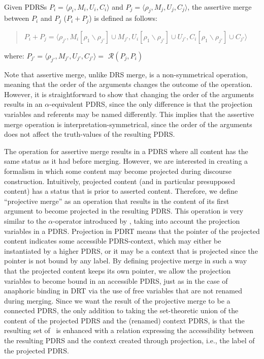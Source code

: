 \begin{definition}\label{def:amerge}~\\
Given PDRSs $P_i=\langle \rho_i,M_i,U_i,C_i \rangle$ and
$P_j=\langle \rho_j,M_j,U_j,C_j \rangle$, the assertive merge between $P_i$
and $P_j$ ($P_i + P_j$) is defined as follows:
  \begin{quote}
    $P_i + P_j = 
      \langle \rho_{j'}, 
      M_{i}[\rho_1\backslash\rho_{j'}] \cup M_{j'},
      U_{i}[\rho_1\backslash\rho_{j'}] \cup U_{j'},
      C_{i}[\rho_1\backslash\rho_{j'}] \cup C_{j'}\rangle$
  \end{quote}
  where: $P_{j'} = \langle \rho_{j'}, M_{j'}, U_{j'}, C_{j'} \rangle =$
      $\mathcal{R}(P_j,P_i)$
\end{definition}

\noindent Note that assertive merge, unlike DRS merge, is a non-symmetrical
operation, meaning that the order of the arguments changes the outcome of
the operation. However, it is straightforward to show that changing the
order of the arguments results in an $\alpha$-equivalent PDRS, since the
only difference is that the projection variables and referents may be named
differently. This implies that the assertive merge operation is
interpretation-symmetrical, since the order of the arguments does not affect
the truth-values of the resulting PDRS.

The operation for assertive merge results in a PDRS where all content has
the same status as it had before merging. However, we are interested in
creating a formalism in which some content may become projected during
discourse construction.  Intuitively, projected content (and in particular
presupposed content) has a status that is prior to asserted content.
Therefore, we define ``projective merge'' as an operation that results in
the content of its first argument to become projected in the resulting PDRS.
This operation is very similar to the $\alpha$-operator introduced by
\cite{bos2003implementing}, taking into account the projection variables in
a PDRS. Projection in PDRT means that the pointer of the projected content
indicates some accessible PDRS-context, which may either be instantiated by
a higher PDRS, or it may be a context that is projected since the pointer is
not bound by any label. By defining projective merge in such a way that the
projected content keeps its own pointer, we allow the projection variables
to become bound in an accessible PDRS, just as in the case of anaphoric
binding in DRT via the use of free variables that are not renamed during
merging. Since we want the result of the projective merge to be a connected
PDRS, the only addition to taking the set-theoretic union of the content of
the projected PDRS and the (renamed) context PDRS, is that the resulting set
of \MAPs~is enhanced with a relation expressing the accessibility between
the resulting PDRS and the context created through projection, i.e.,
the label of the projected PDRS.

